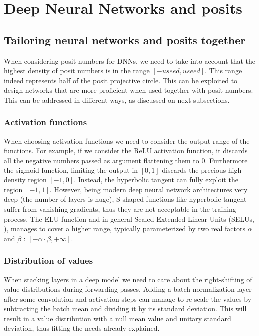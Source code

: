 
\chapter{Deep Neural Networks and posits}
\section{Tailoring neural networks and posits together}

When considering posit numbers for DNNs, we need to take into account that the highest density of posit numbers is in the range $[-useed,useed]$. This range indeed represents half of the posit projective circle. This can be exploited to design networks that are more proficient when used together with posit numbers. This can be addressed in different ways, as discussed on next subsections.

\subsection{Activation functions} When choosing activation functions we need to consider the output range of the functions. For example, if we consider the ReLU activation function, it discards all the negative numbers passed as argument flattening them to $0$. Furthermore the sigmoid function, limiting the output in $[0,1]$ discards the precious high-density region $[-1,0]$. Instead, the hyperbolic tangent can fully exploit the region $[-1,1]$. However, being modern deep neural network architectures very deep (the number of layers is huge), S-shaped functions like hyperbolic tangent suffer from vanishing gradients, thus they are not acceptable in the training process. The ELU function and in general Scaled Extended Linear Units (SELUs, \cite{NIPS2017_6698}), manages to cover a higher range, typically parameterized by two real factors $\alpha$ and $\beta$ : $[-\alpha \cdot \beta,+\infty]$.

\subsection{Distribution of values} When stacking layers in a deep model we need to care about the right-shifting of value distributions during forwarding passes. Adding a batch normalization layer \cite{Ioffe:2015:BNA:3045118.3045167} after some convolution and activation steps can manage to re-scale the values by subtracting the batch mean and dividing it by its standard deviation. This will result in a value distribution with a null mean value and unitary standard deviation, thus fitting the needs already explained. 

